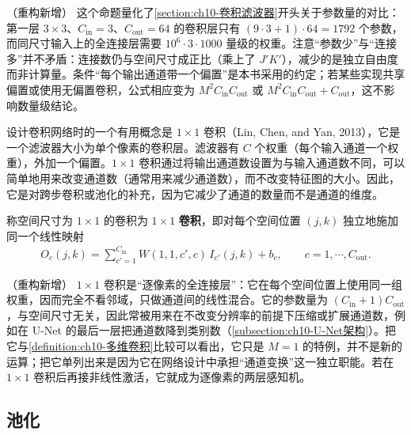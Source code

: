 \documentclass[../../main.tex]{subfiles}
\begin{document}
\begin{remark}（重构新增）
这个命题量化了\cref{section:ch10-卷积滤波器}开头关于参数量的对比：第一层 $3\times 3$、$C_{\mathrm{in}}=3$、$C_{\mathrm{out}}=64$ 的卷积层只有 $(9\cdot3+1)\cdot64=1792$ 个参数，而同尺寸输入上的全连接层需要 $10^6\cdot 3\cdot 1000$ 量级的权重。注意“参数少”与“连接多”并不矛盾：连接数仍与空间尺寸成正比（乘上了 $J'K'$），减少的是独立自由度而非计算量。条件“每个输出通道带一个偏置”是本书采用的约定；若某些实现共享偏置或使用无偏置卷积，公式相应变为 $M^2C_{\mathrm{in}}C_{\mathrm{out}}$ 或 $M^2C_{\mathrm{in}}C_{\mathrm{out}}+C_{\mathrm{out}}$，这不影响数量级结论。
\end{remark}

设计卷积网络时的一个有用概念是 $1\times 1$ 卷积（Lin, Chen, and Yan, 2013），它是一个滤波器大小为单个像素的卷积层。滤波器有 $C$ 个权重（每个输入通道一个权重），外加一个偏置。$1\times 1$ 卷积通过将输出通道数设置为与输入通道数不同，可以简单地用来改变通道数（通常用来减少通道数），而不改变特征图的大小。因此，它是对跨步卷积或池化的补充，因为它减少了通道的数量而不是通道的维度。

\begin{definition}[$1\times 1$ 卷积]\label{definition:ch10-1x1卷积}
称空间尺寸为 $1\times 1$ 的卷积为 $1\times 1$ \textbf{卷积}，即对每个空间位置 $(j,k)$ 独立地施加同一个线性映射
\begin{align}
  O_c(j,k)=\sum_{c'=1}^{C_{\mathrm{in}}} W(1,1,c',c)\,I_{c'}(j,k)+b_c,\qquad c=1,\cdots,C_{\mathrm{out}}.
  \label{align:ch10-1x1卷积}
\end{align}
\end{definition}

\begin{remark}（重构新增）
$1\times 1$ 卷积是“逐像素的全连接层”：它在每个空间位置上使用同一组权重，因而完全不看邻域，只做通道间的线性混合。它的参数量为 $(C_{\mathrm{in}}+1)C_{\mathrm{out}}$，与空间尺寸无关，因此常被用来在不改变分辨率的前提下压缩或扩展通道数，例如在 U-Net 的最后一层把通道数降到类别数（\cref{subsection:ch10-U-Net架构}）。把它与\cref{definition:ch10-多维卷积}比较可以看出，它只是 $M=1$ 的特例，并不是新的运算；把它单列出来是因为它在网络设计中承担“通道变换”这一独立职能。若在 $1\times 1$ 卷积后再接非线性激活，它就成为逐像素的两层感知机。
\end{remark}

\subsection{池化}\label{subsection:ch10-池化}
\end{document}
